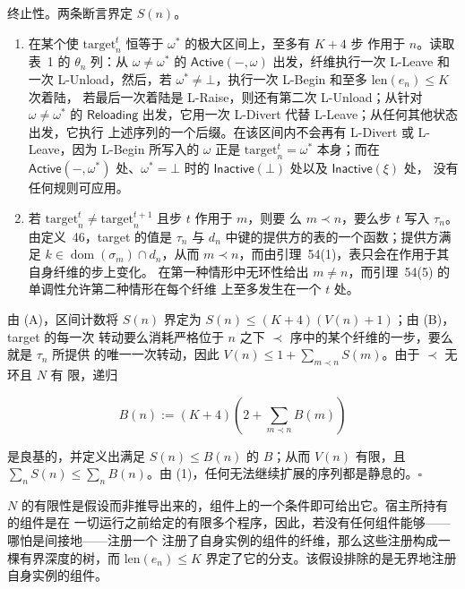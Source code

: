 \documentclass[
  10
]{article}
\begin{document}
终止性。两条断言界定 \(S(n)\)。

\begin{enumerate}
\def\labelenumi{(\Alph{enumi})}
\item
  在某个使 \(\mathrm{target}_{n}^{t}\) 恒等于 \(\omega^{*}\) 的极大区间上，至多有 \(K+4\) 步
  作用于 \(n\)。读取表~1 的 \(\theta_{n}\) 列：从 \(\omega \neq \omega^{*}\) 的
  \(\mathsf{Active}(-,\omega)\) 出发，纤维执行一次 L-Leave 和一次 L-Unload，然后，若
  \(\omega^{*} \neq \bot\)，执行一次 L-Begin 和至多 \(\mathrm{len}(e_{n}) \leq K\) 次着陆，
  若最后一次着陆是 L-Raise，则还有第二次 L-Unload；从针对 \(\omega \neq \omega^{*}\) 的
  \(\mathsf{Reloading}\) 出发，它用一次 L-Divert 代替 L-Leave；从任何其他状态出发，它执行
  上述序列的一个后缀。在该区间内不会再有 L-Divert 或 L-Leave，因为 L-Begin 所写入的
  \(\omega\) 正是 \(\mathrm{target}_{n}^{t} = \omega^{*}\) 本身；而在 \(\mathsf{Active}(-,\omega^{*})\)
  处、\(\omega^{*} = \bot\) 时的 \(\mathsf{Inactive}(\bot)\) 处以及 \(\mathsf{Inactive}(\xi)\) 处，
  没有任何规则可应用。
\item
  若 \(\mathrm{target}_{n}^{t} \neq \mathrm{target}_{n}^{t+1}\) 且步 \(t\) 作用于 \(m\)，则要
  么 \(m \prec n\)，要么步 \(t\) 写入 \(\tau_{n}\)。由定义~46，target 的值是 \(\tau_{n}\) 与
  \(d_{n}\) 中键的提供方的表的一个函数；提供方满足 \(k \in \operatorname{dom}(\sigma_{m})
  \cap d_{n}\)，从而 \(m \prec n\)，而由引理~54(1)，表只会在作用于其自身纤维的步上变化。
  在第一种情形中无环性给出 \(m \neq n\)，而引理~54(5) 的单调性允许第二种情形在每个纤维
  上至多发生在一个 \(t\) 处。
\end{enumerate}

由 (A)，区间计数将 \(S(n)\) 界定为 \(S(n) \leq (K+4)(V(n)+1)\)；由 (B)，target 的每一次
转动要么消耗严格位于 \(n\) 之下 \(\prec\) 序中的某个纤维的一步，要么就是 \(\tau_{n}\) 所提供
的唯一一次转动，因此 \(V(n) \leq 1 + \sum_{m \prec n} S(m)\)。由于 \(\prec\) 无环且 \(N\) 有
限，递归

\[
B(n) := (K+4)\left( 2 + \sum_{m \prec n} B(m) \right)
\]

是良基的，并定义出满足 \(S(n) \leq B(n)\) 的 \(B\)；从而 \(V(n)\) 有限，且
\(\sum_{n} S(n) \leq \sum_{n} B(n)\)。由 (1)，任何无法继续扩展的序列都是静息的。\(\square\)

\(N\) 的有限性是假设而非推导出来的，组件上的一个条件即可给出它。宿主所持有的组件是在
一切运行之前给定的有限多个程序，因此，若没有任何组件能够——哪怕是间接地——注册一个
注册了自身实例的组件的纤维，那么这些注册构成一棵有界深度的树，而
\(\mathrm{len}(e_{n}) \leq K\) 界定了它的分支。该假设排除的是无界地注册自身实例的组件。
\end{document}
